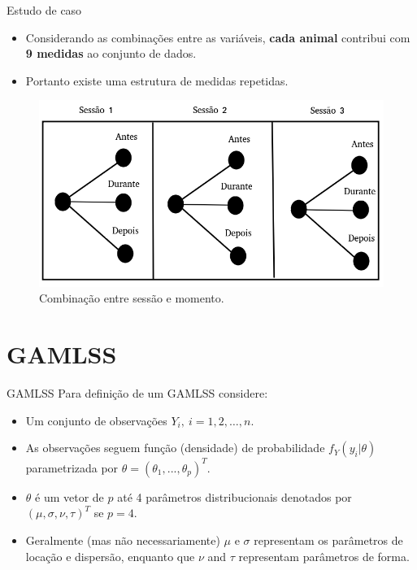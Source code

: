 \documentclass[
  ignorenonframetext,
  serif,
  professionalfont,
  usenames,
  dvipsnames,
  aspectratio = 169]{beamer}
\begin{document}
\begin{frame}{Estudo de caso}
\protect\hypertarget{estudo-de-caso-10}{}
\begin{itemize}
\item
  Considerando as combinações entre as variáveis, \textbf{cada animal}
  contribui com \textbf{9 medidas} ao conjunto de dados.
\item
  Portanto existe uma estrutura de medidas repetidas.
\end{itemize}

\begin{figure}

{\centering \includegraphics[width=0.55\linewidth]{./img/se_mo} 

}

\caption{Combinação entre sessão e momento.}\label{fig:unnamed-chunk-9}
\end{figure}
\end{frame}

\hypertarget{gamlss-2}{%
\section{GAMLSS}\label{gamlss-2}}

\begin{frame}{GAMLSS}
\protect\hypertarget{gamlss-3}{}
Para definição de um GAMLSS considere:

\begin{itemize}
\item
  Um conjunto de observações \(Y_i, \ i=1,2,\ldots,n\).
\item
  As observações seguem função (densidade) de probabilidade
  \(f_Y(y_i|\theta)\) parametrizada por
  \(\theta = (\theta_{1}, ..., \theta_{p})^T\).
\item
  \(\theta\) é um vetor de \(p\) até 4 parâmetros distribucionais
  denotados por \((\mu, \sigma, \nu, \tau)^T\) se \(p=4\).
\item
  Geralmente (mas não necessariamente) \(\mu\) e \(\sigma\) representam
  os parâmetros de locação e dispersão, enquanto que \(\nu\) and
  \(\tau\) representam parâmetros de forma.
\end{itemize}
\end{frame}
\end{document}
